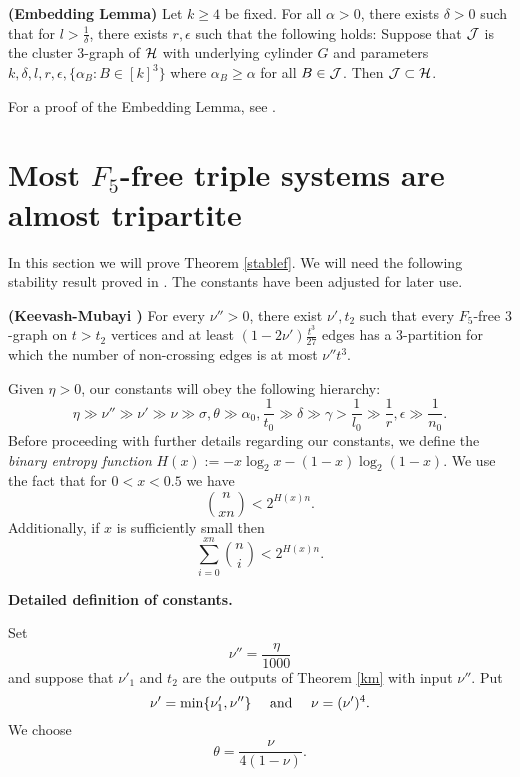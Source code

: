 \documentclass[11pt]{article}
\begin{document}
\begin{lemma} {\bf (Embedding Lemma)} \label{elemma} Let $k \ge 4$ be fixed.
 For all  $\alpha>0$, there exists $\delta>0$ such that for $l>\frac{1}{\delta}$, there exists
  $r, \epsilon$ such that the following holds: Suppose that ${\cal J}$ is the cluster $3$-graph
  of ${\cal H}$ with underlying cylinder $G$ and parameters $k, \delta, l, r, \epsilon, \{\alpha_B: B \in [k]^3\}$
   where $\alpha_B \ge \alpha$ for all $B \in {\cal J}$.  Then ${\cal J} \subset {\cal H}$.
\end{lemma}

For a proof of the Embedding Lemma, see \cite{NR}.

\section{Most $F_5$-free triple systems are almost tripartite}\label{mostrip}

In this section we will prove Theorem \ref{stablef}. We will need
the following stability result proved in \cite{KM}. The constants
have been adjusted for later use.

\begin{theorem} {\bf (Keevash-Mubayi \cite{KM})} \label{km}
For every $\nu''>0$, there exist $\nu', t_2$ such that every
$F_5$-free $3$-graph on $t>t_2$ vertices and at least
$(1-2\nu')\frac{t^3}{27}$ edges has a $3$-partition for which the
number of non-crossing edges is at most $\nu'' t^3$.
\end{theorem}

Given $\eta>0$, our constants will obey the following hierarchy:
$$\eta\gg \nu''\gg \nu' \gg \nu \gg \sigma, \theta
\gg  \alpha_0, \frac{1}{t_0} \gg \delta \gg \gamma >\frac{1}{l_0} \gg\frac{1}{r}, \epsilon \gg \frac{1}{n_0}.$$
Before proceeding with further details regarding our constants,
we define the {\it binary entropy function} $H(x):=
-x\log_2 x- (1-x)\log_2 (1-x).$
We use the fact  that for $0<x< 0.5$ we
have $$\binom{n}{xn}<2^{H(x)n}.$$ Additionally, if $x$ is sufficiently small
then
\begin{equation} \label{x} \sum_{i=0}^{xn} \binom{n}{i}<2^{H(x)n}.\end{equation}


{\bf Detailed definition of constants.}

Set
\begin{equation} \label{nu''def}\nu''=\frac{\eta}{1000}\end{equation}
 and suppose that $\nu'_1$ and $t_2$ are the outputs of Theorem \ref{km} with input $\nu''$.  Put
\begin{equation} \label{nu'}
\nu'=\min\{\nu'_1, \nu''\} \quad \hbox{ and } \quad \nu=(\nu')^4.\end{equation}
We choose
  \begin{equation} \label{theta}
  \theta=\frac{\nu}{4(1-\nu)}.\end{equation}
\end{document}
